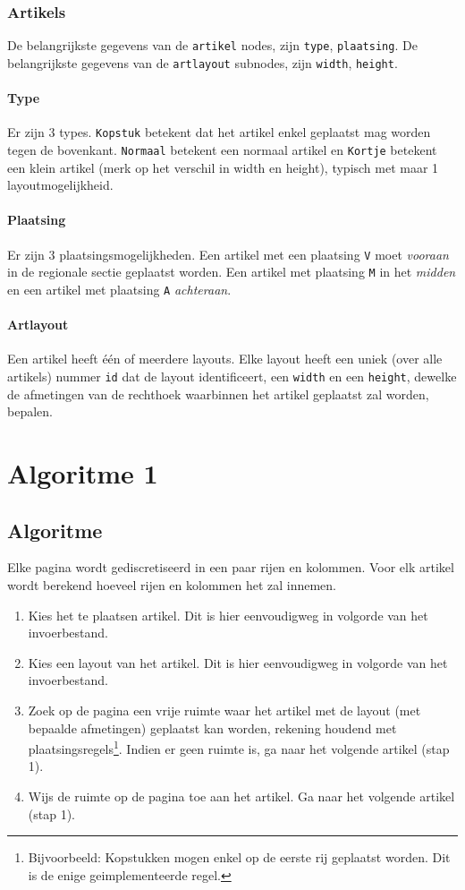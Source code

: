 \documentclass[a4paper,12pt]{report}
\begin{document}
			\subsubsection{Artikels}
De belangrijkste gegevens van de \verb|artikel| nodes, zijn \verb|type|, \verb|plaatsing|. De belangrijkste gegevens van de \verb|artlayout| subnodes, zijn \verb|width|, \verb|height|.

\paragraph{Type} Er zijn 3 types. \verb|Kopstuk| betekent dat het artikel enkel geplaatst mag worden tegen de bovenkant. \verb|Normaal| betekent een normaal artikel en \verb|Kortje| betekent een klein artikel (merk op het verschil in width en height), typisch met maar 1 layoutmogelijkheid.

\paragraph{Plaatsing} Er zijn 3 plaatsingsmogelijkheden. Een artikel met een plaatsing \verb|V| moet \textit{vooraan} in de regionale sectie geplaatst worden. Een artikel met plaatsing \verb|M| in het \textit{midden} en een artikel met plaatsing \verb|A| \textit{achteraan}.

\paragraph{Artlayout} Een artikel heeft één of meerdere layouts. Elke layout heeft een uniek (over alle artikels) nummer \verb|id| dat de layout identificeert, een \verb|width| en een \verb|height|, dewelke de afmetingen van de rechthoek waarbinnen het artikel geplaatst zal worden, bepalen.

	\section{Algoritme 1}
		\subsection{Algoritme}
Elke pagina wordt gediscretiseerd in een paar rijen en kolommen. Voor elk artikel wordt berekend hoeveel rijen en kolommen het zal innemen. 
\begin{enumerate}
	\item Kies het te plaatsen artikel. Dit is hier eenvoudigweg in volgorde van het invoerbestand. 
	\item Kies een layout van het artikel. Dit is hier eenvoudigweg in volgorde van het invoerbestand.
	\item Zoek op de pagina een vrije ruimte waar het artikel met de layout (met bepaalde afmetingen) geplaatst kan worden, rekening houdend met plaatsingsregels\footnote{Bijvoorbeeld: Kopstukken mogen enkel op de eerste rij geplaatst worden. Dit is de enige geimplementeerde regel.}. Indien er geen ruimte is, ga naar het volgende artikel (stap 1).
	\item Wijs de ruimte op de pagina toe aan het artikel. Ga naar het volgende artikel (stap 1).
\end{enumerate}
			
\end{document}
